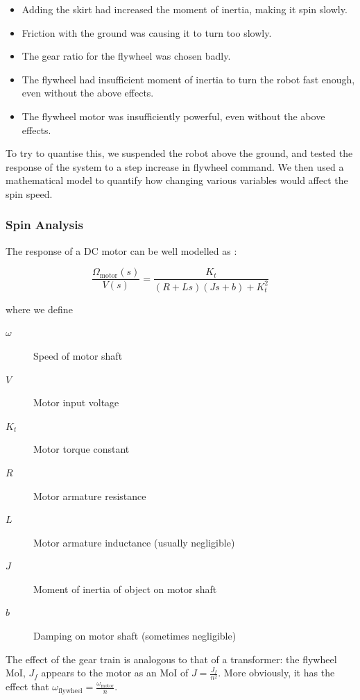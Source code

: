 \documentclass{IIBproject}
\begin{document}
\begin{itemize}
  \item Adding the skirt had increased the moment of inertia, making it spin
    slowly.
  \item Friction with the ground was causing it to turn too slowly.
  \item The gear ratio for the flywheel was chosen badly.
  \item The flywheel had insufficient moment of inertia to turn the robot fast
    enough, even without the above effects.
  \item The flywheel motor was insufficiently powerful, even without the above
    effects.
    \end{itemize}

To try to quantise this, we suspended the robot above the ground, and tested
the response of the system to a step increase in flywheel command. We then
used a mathematical model to quantify how changing various variables would
affect the spin speed.

\subsubsection{Spin Analysis}

The response of a DC motor can be well modelled as \cite{ref:6302}:

\begin{equation*}
  \frac{\Omega_\textrm{motor}(s)}{V(s)} = \frac{K_t}{(R+Ls)(Js+b)+K_t^2}
  \end{equation*}

where we define

\begin{description}
  \item[$\omega$] Speed of motor shaft
  \item[$V$] Motor input voltage
  \item[$K_t$] Motor torque constant
  \item[$R$] Motor armature resistance
  \item[$L$] Motor armature inductance (usually negligible)
  \item[$J$] Moment of inertia of object on motor shaft
  \item[$b$] Damping on motor shaft (sometimes negligible)
    \end{description}

The effect of the gear train is analogous to that of a transformer: the
flywheel MoI, $J_f$ appears to the motor as an MoI of $J = \frac{J_f}{n^2}$.
More obviously, it has the effect that $\omega_\textrm{flywheel} =
\frac{\omega_\textrm{motor}}{n}$.
\end{document}
